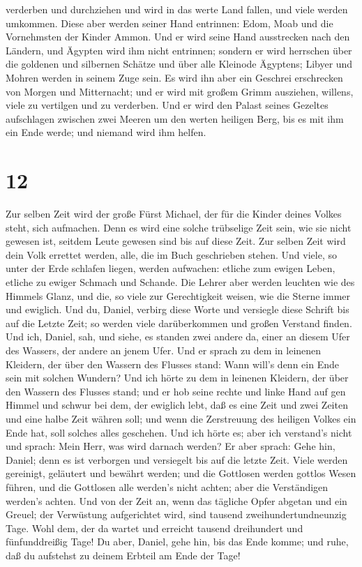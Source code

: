 verderben und durchziehen  und wird in das werte Land
fallen, und viele werden umkommen. Diese aber werden seiner Hand
entrinnen: Edom, Moab und die Vornehmsten der Kinder Ammon.
 Und er wird seine Hand ausstrecken nach den Ländern, und
Ägypten wird ihm nicht entrinnen;  sondern er wird
herrschen über die goldenen und silbernen Schätze und über alle Kleinode
Ägyptens; Libyer und Mohren werden in seinem Zuge sein.  Es
wird ihn aber ein Geschrei erschrecken von Morgen und Mitternacht; und
er wird mit großem Grimm ausziehen, willens, viele zu vertilgen und zu
verderben.  Und er wird den Palast seines Gezeltes
aufschlagen zwischen zwei Meeren um den werten heiligen Berg, bis es mit
ihm ein Ende werde; und niemand wird ihm helfen.

\hypertarget{section-11}{%
\section{12}\label{section-11}}

 Zur selben Zeit wird der große Fürst Michael, der für die
Kinder deines Volkes steht, sich aufmachen. Denn es wird eine solche
trübselige Zeit sein, wie sie nicht gewesen ist, seitdem Leute gewesen
sind bis auf diese Zeit. Zur selben Zeit wird dein Volk errettet werden,
alle, die im Buch geschrieben stehen.  Und viele, so unter
der Erde schlafen liegen, werden aufwachen: etliche zum ewigen Leben,
etliche zu ewiger Schmach und Schande.  Die Lehrer aber
werden leuchten wie des Himmels Glanz, und die, so viele zur
Gerechtigkeit weisen, wie die Sterne immer und ewiglich. 
Und du, Daniel, verbirg diese Worte und versiegle diese Schrift bis auf
die Letzte Zeit; so werden viele darüberkommen und großen Verstand
finden.  Und ich, Daniel, sah, und siehe, es standen zwei
andere da, einer an diesem Ufer des Wassers, der andere an jenem Ufer.
 Und er sprach zu dem in leinenen Kleidern, der über den
Wassern des Flusses stand: Wann will's denn ein Ende sein mit solchen
Wundern?  Und ich hörte zu dem in leinenen Kleidern, der
über den Wassern des Flusses stand; und er hob seine rechte und linke
Hand auf gen Himmel und schwur bei dem, der ewiglich lebt, daß es eine
Zeit und zwei Zeiten und eine halbe Zeit währen soll; und wenn die
Zerstreuung des heiligen Volkes ein Ende hat, soll solches alles
geschehen.  Und ich hörte es; aber ich verstand's nicht und
sprach: Mein Herr, was wird darnach werden?  Er aber sprach:
Gehe hin, Daniel; denn es ist verborgen und versiegelt bis auf die
letzte Zeit.  Viele werden gereinigt, geläutert und bewährt
werden; und die Gottlosen werden gottlos Wesen führen, und die Gottlosen
alle werden's nicht achten; aber die Verständigen werden's achten.
 Und von der Zeit an, wenn das tägliche Opfer abgetan und
ein Greuel; der Verwüstung aufgerichtet wird, sind tausend
zweihundertundneunzig Tage.  Wohl dem, der da wartet und
erreicht tausend dreihundert und fünfunddreißig Tage!  Du
aber, Daniel, gehe hin, bis das Ende komme; und ruhe, daß du aufstehst
zu deinem Erbteil am Ende der Tage!
